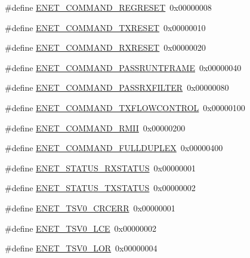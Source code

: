\begin{DoxyCompactItemize}
\item 
\#define \hyperlink{group__ENET__17XX__40XX_ga6745bb544166e94ec0ec4635ce85c2a2}{E\-N\-E\-T\-\_\-\-C\-O\-M\-M\-A\-N\-D\-\_\-\-R\-E\-G\-R\-E\-S\-E\-T}~0x00000008
\item 
\#define \hyperlink{group__ENET__17XX__40XX_gab9c38db14b3c0edbe8f9a9062d653612}{E\-N\-E\-T\-\_\-\-C\-O\-M\-M\-A\-N\-D\-\_\-\-T\-X\-R\-E\-S\-E\-T}~0x00000010
\item 
\#define \hyperlink{group__ENET__17XX__40XX_gabcbc994bca6d1eb4b677e8f8c58e3ef9}{E\-N\-E\-T\-\_\-\-C\-O\-M\-M\-A\-N\-D\-\_\-\-R\-X\-R\-E\-S\-E\-T}~0x00000020
\item 
\#define \hyperlink{group__ENET__17XX__40XX_ga22c8103c39e17d184acb4956428022c8}{E\-N\-E\-T\-\_\-\-C\-O\-M\-M\-A\-N\-D\-\_\-\-P\-A\-S\-S\-R\-U\-N\-T\-F\-R\-A\-M\-E}~0x00000040
\item 
\#define \hyperlink{group__ENET__17XX__40XX_gad15a361a9ea2dae055b13d1416dde2df}{E\-N\-E\-T\-\_\-\-C\-O\-M\-M\-A\-N\-D\-\_\-\-P\-A\-S\-S\-R\-X\-F\-I\-L\-T\-E\-R}~0x00000080
\item 
\#define \hyperlink{group__ENET__17XX__40XX_ga720037c58537b876089d9d3f4df0130f}{E\-N\-E\-T\-\_\-\-C\-O\-M\-M\-A\-N\-D\-\_\-\-T\-X\-F\-L\-O\-W\-C\-O\-N\-T\-R\-O\-L}~0x00000100
\item 
\#define \hyperlink{group__ENET__17XX__40XX_ga933d30adf6557d69ddcd1bd0ff3dd3b5}{E\-N\-E\-T\-\_\-\-C\-O\-M\-M\-A\-N\-D\-\_\-\-R\-M\-I\-I}~0x00000200
\item 
\#define \hyperlink{group__ENET__17XX__40XX_gac5380c0bb8853772b22db6b37b2c812e}{E\-N\-E\-T\-\_\-\-C\-O\-M\-M\-A\-N\-D\-\_\-\-F\-U\-L\-L\-D\-U\-P\-L\-E\-X}~0x00000400
\item 
\#define \hyperlink{group__ENET__17XX__40XX_gad0face01c298deb04c2a6df44839db44}{E\-N\-E\-T\-\_\-\-S\-T\-A\-T\-U\-S\-\_\-\-R\-X\-S\-T\-A\-T\-U\-S}~0x00000001
\item 
\#define \hyperlink{group__ENET__17XX__40XX_gae74d3a5997ed8bf6618a4896b12403e8}{E\-N\-E\-T\-\_\-\-S\-T\-A\-T\-U\-S\-\_\-\-T\-X\-S\-T\-A\-T\-U\-S}~0x00000002
\item 
\#define \hyperlink{group__ENET__17XX__40XX_gadb4cb33d047889ef5584d58ee0110140}{E\-N\-E\-T\-\_\-\-T\-S\-V0\-\_\-\-C\-R\-C\-E\-R\-R}~0x00000001
\item 
\#define \hyperlink{group__ENET__17XX__40XX_gaca1a7e04bad3d3a31621f81ee11e7833}{E\-N\-E\-T\-\_\-\-T\-S\-V0\-\_\-\-L\-C\-E}~0x00000002
\item 
\#define \hyperlink{group__ENET__17XX__40XX_gadf4b40d301d071e9f0a7819ad45dc534}{E\-N\-E\-T\-\_\-\-T\-S\-V0\-\_\-\-L\-O\-R}~0x00000004

\end{DoxyCompactItemize}
